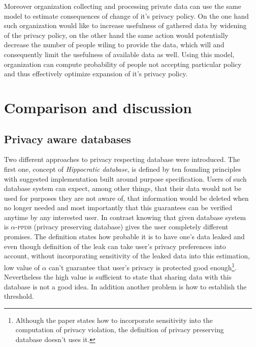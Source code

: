 \documentclass[a4paper]{article}
\begin{document}
Moreover organization collecting and processing private data can use the same
model to estimate consequences of change of it's privacy policy.
On the one hand such organization would like to increase usefulness of gathered
data by widening of the privacy policy, on the other hand the same action would
potentially decrease the number of people wiling to provide the data, which will
and consequently limit the usefulness of available data as well.
Using this model, organization can compute probability of people not accepting
particular policy and thus effectively optimize expansion of it's privacy
policy.

\section{Comparison and discussion}

\subsection{Privacy aware databases}
Two different approaches to privacy respecting database were introduced.
The first one, concept of \emph{Hippocratic database}, is defined by ten
founding principles with suggested implementation built around purpose
specification. Users of such database system can expect, among other things,
that their data would not be used for purposes they are not aware of,
that information would be deleted when no longer needed
and most importantly that this guarantees can be verified anytime by any
interested user.
In contrast knowing that given database system is $\alpha$-\textsc{ppdb}
(privacy preserving database) \cite{paper_qpv} gives the user completely
different promises.
The definition states how probable it is to have one's data leaked and even
though definition of the leak can take user's privacy preferences into account,
without incorporating sensitivity of the leaked data into this estimation, low
value of $\alpha$ can't guarantee that user's privacy is protected good
enough\footnote{Although the paper states how to incorporate sensitivity into
the computation of privacy violation, the definition of privacy preserving
database doesn't uses it.}.
Nevertheless the high value is sufficient to state that sharing data with this
database is not a good idea. In addition another problem is how to establish
the threshold.
\end{document}
